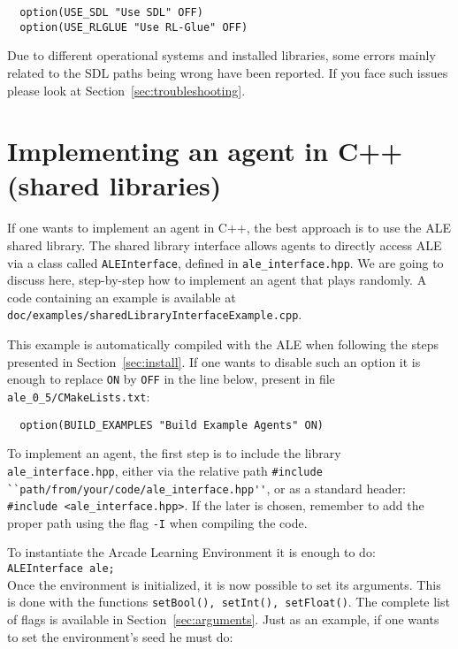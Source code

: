 \documentclass[12pt]{article}
\begin{document}
\begin{verbatim}
  option(USE_SDL "Use SDL" OFF)
  option(USE_RLGLUE "Use RL-Glue" OFF)
\end{verbatim}

Due to different operational systems and installed libraries, some errors mainly related to the SDL 
paths being wrong have been reported. If you face such issues please look at 
Section~\ref{sec:troubleshooting}.

\section{Implementing an agent in C++ (shared libraries)}

If one wants to implement an agent in C++, the best approach is to use the ALE shared library. 
The shared library interface allows agents to directly access ALE via a class called
\verb+ALEInterface+, defined in \verb+ale_interface.hpp+. We are going to discuss here, 
step-by-step how to implement an agent that plays randomly. A code containing an example is
available at \verb+doc/examples/sharedLibraryInterfaceExample.cpp+.

This example is automatically compiled with the ALE when following the steps presented in
Section~\ref{sec:install}. If one wants to disable such an option it is enough to replace \verb+ON+ 
by \verb+OFF+ in the line below, present in file \verb+ale_0_5/CMakeLists.txt+:

\begin{verbatim}
  option(BUILD_EXAMPLES "Build Example Agents" ON)
\end{verbatim}

To implement an agent, the first step is to include the library \verb+ale_interface.hpp+, either via 
the relative path \verb+#include ``path/from/your/code/ale_interface.hpp''+, or as a standard 
header: \verb+#include <ale_interface.hpp>+. If the later is chosen, remember to add the proper 
path using the flag \verb+-I+ when compiling the code.

To instantiate the Arcade Learning Environment it is enough to do:\\

\verb+ALEInterface ale;+\\

Once the environment is initialized, it is now possible to set its arguments. This is done with the 
functions \verb+setBool(), setInt(), setFloat()+. The complete list of flags is available in 
Section~\ref{sec:arguments}. Just as an example, if one wants to set the environment's seed he must 
do:\\
\end{document}
